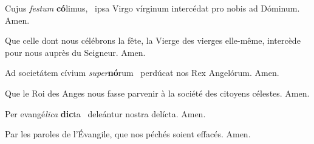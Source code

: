 \documentclass[nocturnal_bvm_fr.tex]{subfiles}
\begin{document}
\begin{customparacol}

Cujus \textit{festum} \textbf{có}limus,~\GreSpecial{*}
ipsa Virgo vírginum intercédat pro nobis ad Dóminum.
\hspace{\specialcharhsep}\rr Amen.

\customswitchcolumn

Que celle dont nous célébrons la fête, la Vierge des vierges elle-même, intercède pour nous auprès du Seigneur.
\hspace{\specialcharhsep}\rr Amen.

\end{customparacol}


\begin{customparacol}

Ad societátem cívium \textit{super}\textbf{nó}rum~\GreSpecial{*}
perdúcat nos Rex Angelórum.
\hspace{\specialcharhsep}\rr Amen.

\customswitchcolumn

Que le Roi des Anges nous fasse parvenir à la société des citoyens célestes.
\hspace{\specialcharhsep}\rr Amen.

\end{customparacol}


\begin{customparacol}

Per evangé\textit{lica} \textbf{dic}ta~\GreSpecial{*}
deleántur nostra delícta.
\hspace{\specialcharhsep}\rr Amen.

\customswitchcolumn

Par les paroles de l'Évangile, que nos péchés soient effacés.
\hspace{\specialcharhsep}\rr Amen.

\end{customparacol}
\end{document}
